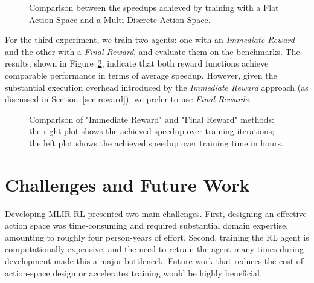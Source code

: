 \documentclass[10pt,twocolumn]{article}
\begin{document}
\begin{figure}[t]
\centering
{}
\caption{Comparison between the speedups achieved by training with a Flat Action Space and a Multi-Discrete Action Space.}
\label{fig:flatvsmd}
\end{figure}

For the third experiment, we train two agents: one with an \emph{Immediate Reward} and the other with a \emph{Final Reward}, and evaluate them on the benchmarks. The results, shown in Figure~\ref{fig:rewardcomparison}, indicate that both reward functions achieve comparable performance in terms of average speedup. However, given the substantial execution overhead introduced by the \emph{Immediate Reward} approach (as discussed in Section~\ref{sec:reward}), we prefer to use \emph{Final Rewards}.

\begin{figure}[t]
\centering
{}
\caption{Comparison of "Immediate Reward" and "Final Reward" methods: the right plot shows the achieved speedup over training iterations; the left plot shows the achieved speedup over training time in hours.}
\label{fig:rewardcomparison}
\end{figure}

\section{Challenges and Future Work}

Developing MLIR RL presented two main challenges. First, designing an effective action space was time-consuming and required substantial domain expertise, amounting to roughly four person-years of effort. Second, training the RL agent is computationally expensive, and the need to retrain the agent many times during development made this a major bottleneck. Future work that reduces the cost of action-space design or accelerates training would be highly beneficial.
\end{document}
